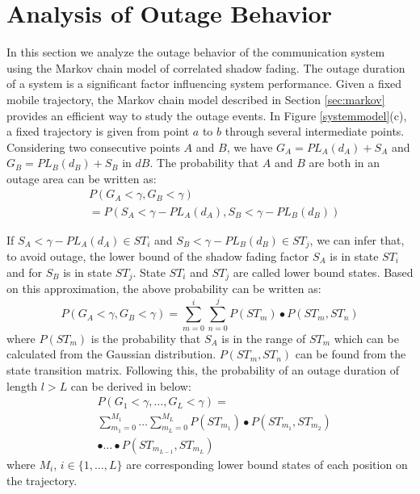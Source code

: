 \section{Analysis of Outage Behavior}
\label{sec:outage}
In this section we analyze the outage behavior of the communication system using the Markov chain model of correlated shadow fading. The outage duration of a system is a significant factor influencing system performance. Given a fixed mobile trajectory, the Markov chain model described in Section \ref{sec:markov} provides an efficient way to study the outage events. In Figure \ref{systemmodel}(c), a fixed trajectory is given from point $a$ to $b$ through several intermediate points. Considering two consecutive points $A$ and $B$, we have $G_{A}=PL_{A}(d_{A})+S_{A}$ and $G_{B}=PL_{B}(d_{B})+S_{B}$ in $dB$. The probability that $A$ and $B$ are both in an outage area can be written as:
\begin{equation}
\begin{split}
&P(G_{A}<\gamma, G_{B}<\gamma) \\
&= P(S_{A}<\gamma-PL_{A}(d_{A}), S_{B}<\gamma-PL_{B}(d_{B}))
\end{split}
\end{equation}

If $S_{A}<\gamma-PL_{A}(d_{A}) \in ST_{i}$ and $S_{B}<\gamma-PL_{B}(d_{B}) \in ST_{j}$, we can infer that, to avoid outage, the lower bound of the shadow fading factor $S_{A}$ is in state $ST_{i}$ and for $S_{B}$ is in state $ST_{j}$. State $ST_{i}$ and $ST_{j}$ are called lower bound states. Based on this approximation, the above probability can be written as:
\begin{equation}
P(G_{A}<\gamma, G_{B}<\gamma)=\sum_{m=0}^{i}\sum_{n=0}^{j} P(ST_{m})\bullet P(ST_{m},ST_{n})
\end{equation}
where $P(ST_{m})$ is the probability that $S_{A}$ is in the range of $ST_{m}$ which can be calculated from the Gaussian distribution. $P(ST_{m},ST_{n})$ can be found from the state transition matrix. Following this, the probability of an outage duration of length $l>L$ can be derived in below:
\begin{equation}
\begin{split}
&P(G_{1}<\gamma,\dots,G_{L}<\gamma)=\\
&\sum_{m_{1}=0}^{M_{1}}\dots\sum_{m_{L}=0}^{M_{L}} P(ST_{m_{1}})\bullet P(ST_{m_{1}},ST_{m_{2}})\\
&\bullet\dots\bullet P(ST_{m_{L-1}},ST_{m_{L}})
\end{split}
\end{equation}
where $M_{i}$, $i\in\{1,\dots,L\}$ are corresponding lower bound states of each position on the trajectory.


